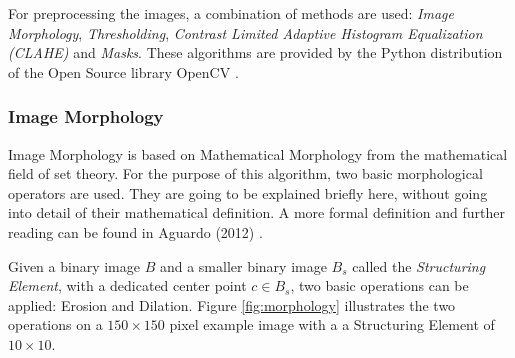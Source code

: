 \documentclass[serif,article,noparskip]{agse-thesis}
\begin{document}
For preprocessing the images, a combination of methods are used: \textit{Image
Morphology}, \textit{Thresholding}, \textit{Contrast Limited Adaptive Histogram
Equalization (CLAHE)} and \textit{Masks}. These algorithms are provided by the
Python distribution of the Open Source library OpenCV \cite{opencv_library}.

\subsubsection{Image Morphology}

Image Morphology is based on Mathematical Morphology from the mathematical field
of set theory. For the purpose of this algorithm, two basic morphological
operators are used. They are going to be explained briefly here, without
going into detail of their mathematical definition. A more formal definition and
further reading can be found in Aguardo (2012) \cite{Aguardo2012}.

Given a binary image $B$ and a smaller binary image $B_s$ called the
\textit{Structuring Element}, with a dedicated center point $c \in B_s$, two
basic operations can be applied: Erosion and Dilation. Figure \ref{fig:morphology}
illustrates the two operations on a $150 \times 150$ pixel example image with a
a Structuring Element of $10 \times 10$.
\end{document}
